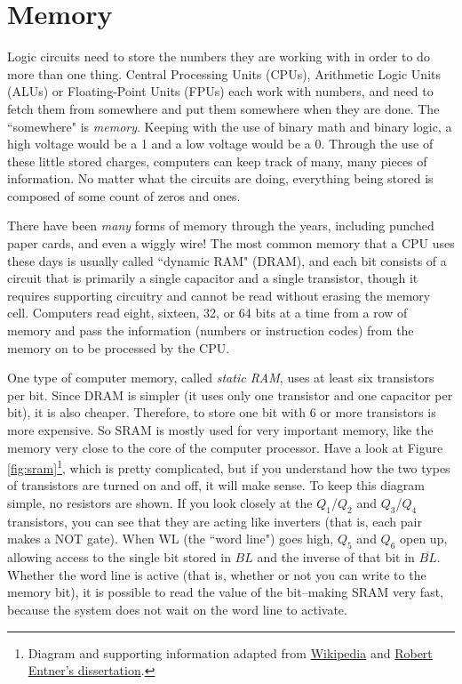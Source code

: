 \section{Memory}

Logic circuits need to store the numbers they are working with in order to do more than one thing. Central Processing Units (CPUs), Arithmetic Logic Units (ALUs) or Floating-Point Units (FPUs) each work with numbers, and need to fetch them from somewhere and put them somewhere when they are done. The ``somewhere" is \emph{memory}. Keeping with the use of binary math and binary logic, a high voltage would be a 1 and a low voltage would be a 0. Through the use of these little stored charges, computers can keep track of many, many pieces of information. No matter what the circuits are doing, everything being stored is composed of some count of zeros and ones. 

There have been \emph{many} forms of memory through the years, including punched paper cards, and even a wiggly wire! The most common memory that a CPU uses these days is usually called ``dynamic RAM" (DRAM), and each bit consists of a circuit that is primarily a single capacitor and a single transistor, though it requires supporting circuitry and cannot be read without erasing the memory cell. Computers read eight, sixteen, 32, or 64 bits at a time from a row of memory and pass the information (numbers or instruction codes) from the memory on to be processed by the CPU.

One type of computer memory, called \emph{static RAM}, uses at least six transistors per bit. Since  DRAM is simpler (it uses only one transistor and one capacitor per bit), it is also cheaper. Therefore, to store one bit with 6 or more transistors is more expensive. So SRAM is mostly used for very important memory, like the memory very close to the core of the computer processor. Have a look at Figure \ref{fig:sram}\footnote{Diagram and supporting information adapted from {\color{webblue}\href{https://en.wikipedia.org/wiki/Static_random-access_memory}{Wikipedia}} and {\color{webblue}\href{https://www.entner.net/sites/default/files/diss-entner-final-v1.pdf}{Robert Entner's dissertation}}.}, 
which is pretty complicated, but if you understand how the two types of transistors are turned on and off, it will make sense. To keep this diagram simple, no resistors are shown. If you look closely at the $Q_1$/$Q_2$ and $Q_3$/$Q_4$ transistors, you can see that they are acting like inverters (that is, each pair makes a NOT gate). When WL (the ``word line") goes high, $Q_5$ and $Q_6$ open up, allowing access to the single bit stored in $BL$ and the inverse of that bit in $\overline{BL}$. Whether the word line is active (that is, whether or not you can write to the memory bit), it is possible to read the value of the bit--making SRAM very fast, because the system does not wait on the word line to activate.


